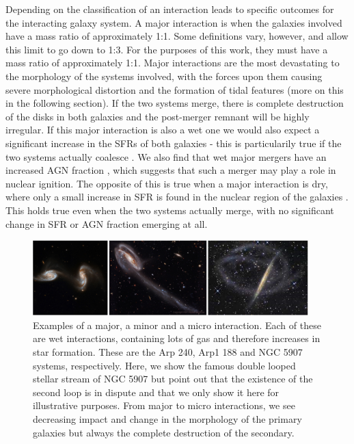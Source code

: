 Depending on the classification of an interaction leads to specific outcomes for the interacting galaxy system. A major interaction is when the galaxies involved have a mass ratio of approximately 1:1. Some definitions vary, however, and allow this limit to go down to 1:3. For the purposes of this work, they must have a mass ratio of approximately 1:1. Major interactions are the most devastating to the morphology of the systems involved, with the forces upon them causing severe morphological distortion and the formation of tidal features (more on this in the following section). If the two systems merge, there is complete destruction of the disks in both galaxies and the post-merger remnant will be highly irregular. If this major interaction is also a wet one we would also expect a significant increase in the SFRs of both galaxies \citep{Increases in SFR in wet interactions} - this is particularily true if the two systems actually coalesce \citep{Papers on increases in SFR in coalesced mergers}. We also find that wet major mergers have an increased AGN fraction \citep{Paper on wet major mergers and AGN}, which suggests that such a merger may play a role in nuclear ignition. The opposite of this is true when a major interaction is dry, where only a small increase in SFR is found in the nuclear region of the galaxies \citep{Papers on dry mergers leading to increased SFR in the nuclear region}. This holds true even when the two systems actually merge, with no significant change in SFR or AGN fraction emerging at all.

\begin{figure}
    \centering
    \includegraphics[width=0.95\textwidth]{Introduction/figures/combined-examples-mergers.jpg}
    \caption{Examples of a major, a minor and a micro interaction. Each of these are wet interactions, containing lots of gas and therefore increases in star formation. These are the Arp 240, Arp1 188 and NGC 5907 systems, respectively. Here, we show the famous double looped stellar stream of NGC 5907 but point out that the existence of the second loop is in dispute and that we only show it here for illustrative purposes. From major to micro interactions, we see decreasing impact and change in the morphology of the primary galaxies but always the complete destruction of the secondary.}
    \label{fig:merger-clsfs}
\end{figure}

